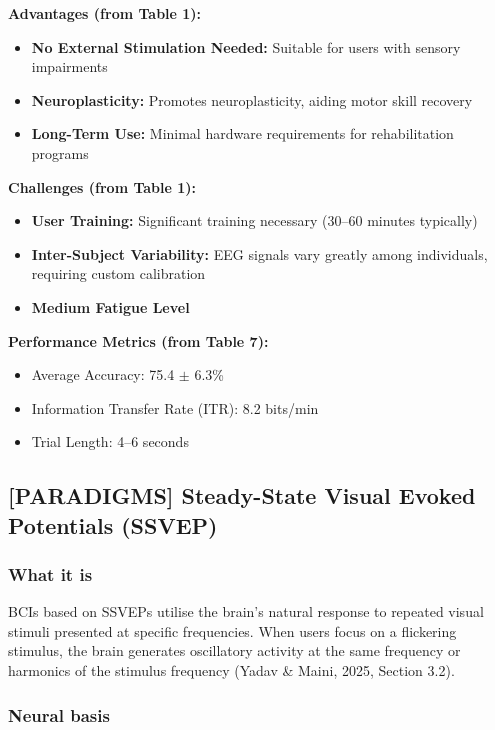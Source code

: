 \documentclass[12pt]{article}
\begin{document}
\textbf{Advantages (from Table 1):}
\begin{itemize}
    \item \textbf{No External Stimulation Needed:} Suitable for users with sensory impairments
    \item \textbf{Neuroplasticity:} Promotes neuroplasticity, aiding motor skill recovery
    \item \textbf{Long-Term Use:} Minimal hardware requirements for rehabilitation programs
\end{itemize}

\textbf{Challenges (from Table 1):}
\begin{itemize}
    \item \textbf{User Training:} Significant training necessary (30–60 minutes typically)
    \item \textbf{Inter-Subject Variability:} EEG signals vary greatly among individuals, requiring custom calibration
    \item \textbf{Medium Fatigue Level}
\end{itemize}

\textbf{Performance Metrics (from Table 7):}
\begin{itemize}
    \item Average Accuracy: 75.4 $\pm$ 6.3\%
    \item Information Transfer Rate (ITR): 8.2 bits/min
    \item Trial Length: 4–6 seconds
\end{itemize}

\subsection{[PARADIGMS] Steady-State Visual Evoked Potentials (SSVEP)}

\subsubsection{What it is}

BCIs based on SSVEPs utilise the brain's natural response to repeated visual stimuli presented at specific frequencies. When users focus on a flickering stimulus, the brain generates oscillatory activity at the same frequency or harmonics of the stimulus frequency (Yadav \& Maini, 2025, Section 3.2).

\subsubsection{Neural basis}
\end{document}
